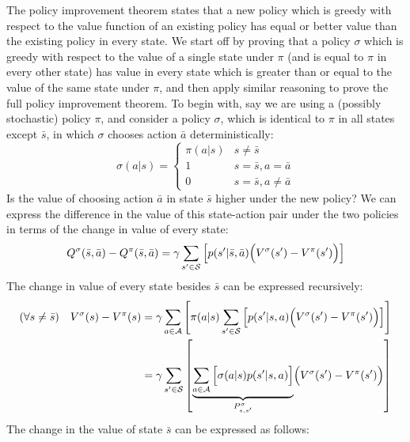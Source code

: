 The policy improvement theorem states that a new policy which is greedy with respect to the value function of an existing policy has equal or better value than the existing policy in every state. We start off by proving that a policy $\sigma$ which is greedy with respect to the value of a single state under $\pi$ (and is equal to $\pi$ in every other state) has value in every state which is greater than or equal to the value of the same state under $\pi$, and then apply similar reasoning to prove the full policy improvement theorem. To begin with, say we are using a (possibly stochastic) policy $\pi$, and consider a policy $\sigma$, which is identical to $\pi$ in all states except $\bar{s}$, in which $\sigma$ chooses action $\bar{a}$ deterministically:
\begin{equation*}
    \sigma(a\vert s) = \begin{cases}
        \pi(a\vert s) & s \ne \bar{s} \\
        1 & s=\bar{s}, a=\bar{a} \\
        0 & s=\bar{s}, a\ne\bar{a}
    \end{cases}
\end{equation*}
Is the value of choosing action $\bar{a}$ in state $\bar{s}$ higher under the new policy? We can express the difference in the value of this state-action pair under the two policies in terms of the change in value of every state:
\begin{equation*}
    Q^\sigma(\bar{s}, \bar{a}) - Q^\pi(\bar{s}, \bar{a}) = \gamma \sum_{s'\in\mathcal{S}}{\Bigl[ p(s'\vert \bar{s}, \bar{a}) \Bigl( V^\sigma(s') - V^\pi(s') \Bigr) \Bigr]}
\end{equation*}
The change in value of every state besides $\bar{s}$ can be expressed recursively:
\begin{align*}
    (\forall s \ne \bar{s}) \quad V^\sigma(s) - V^\pi(s) &= \gamma \sum_{a\in\mathcal{A}}{\left[ \pi(a\vert s) \sum_{s'\in\mathcal{S}}{\Bigl[ p(s'\vert s, a) \Bigl( V^\sigma(s') - V^\pi(s') \Bigr) \Bigr]} \right]} \\
    &= \gamma\sum_{s'\in\mathcal{S}}{\left[ \underbrace{\sum_{a\in\mathcal{A}}{\Bigl[ \sigma(a\vert s) p(s'\vert s, a) \Bigr]}}_{P^\sigma_{s, s'}} \Bigl( V^\sigma(s') - V^\pi(s') \Bigr) \right]}
\end{align*}
The change in the value of state $\bar{s}$ can be expressed as follows:
